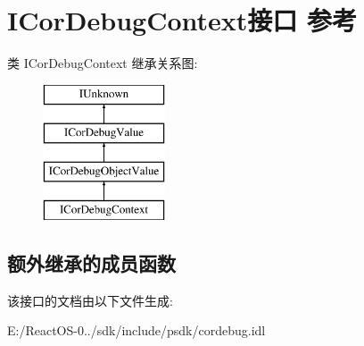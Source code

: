 \hypertarget{interface_i_cor_debug_context}{}\section{I\+Cor\+Debug\+Context接口 参考}
\label{interface_i_cor_debug_context}
类 I\+Cor\+Debug\+Context 继承关系图\+:\begin{figure}[H]
\begin{center}
\leavevmode
\includegraphics[height=4.000000cm]{interface_i_cor_debug_context}
\end{center}
\end{figure}
\subsection*{额外继承的成员函数}


该接口的文档由以下文件生成\+:\begin{DoxyCompactItemize}
\item 
E\+:/\+React\+O\+S-\/0../sdk/include/psdk/cordebug.\+idl\end{DoxyCompactItemize}
